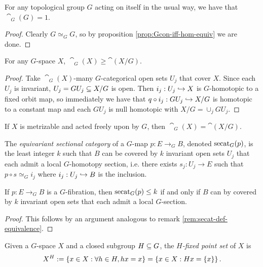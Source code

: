 \begin{corollary}
    For any topological group $G$ acting on itself in the usual way, we have that $\cat_G(G) = 1$.
    \begin{proof}
        Clearly $G \simeq_G G$, so by proposition \ref{prop:Gcon-iff-hom-equiv} we are done.
    \end{proof}
\end{corollary}

\begin{proposition}
    For any $G$-space $X$, $\cat_G(X) \geq \cat(X/G)$.
    \begin{proof}
        Take $\cat_G(X)$-many $G$-categorical open sets $U_j$ that cover $X$.
        Since each $U_j$ is invariant, $U_j = GU_j \subseteq X/G$ is open.
        Then $i_j : U_j \hookrightarrow X$ is $G$-homotopic to a fixed orbit map, so immediately we have that $q \circ i_j : GU_j \hookrightarrow X/G$ is homotopic to a constant map and each $GU_j$ is null homotopic with $X/G = \cup_j GU_j$.
    \end{proof}
\end{proposition}

\begin{proposition}
    If $X$ is metrizable and acted freely upon by $G$, then $\cat_G(X) = \cat(X/G)$.
\end{proposition}

\begin{definition}
    The \emph{equivariant sectional category} of a $G$-map $p : E \to_G B$, denoted $\operatorname{secat}_G(p)$, is the least integer $k$ such that $B$ can be covered by $k$ invariant open sets $U_j$ that each admit a local $G$-homotopy section, i.e. there exists $s_j : U_j \to E$ such that $p \circ s \simeq_G i_j$ where $i_j : U_j \hookrightarrow B$ is the inclusion.
\end{definition}

\begin{proposition}
    If $p : E \to_G B$ is a $G$-fibration, then $\operatorname{secat}_G(p) \leq k$ if and only if $B$ can by covered by $k$ invariant open sets that each admit a local $G$-section.
    \begin{proof}
        This follows by an argument analogous to remark \ref{rem:secat-def-equivalence}.
    \end{proof}
\end{proposition}

\begin{definition}
    Given a $G$-space $X$ and a closed subgroup $H \subseteq G$, the \emph{$H$-fixed point set} of $X$ is
    \[
        X^H
        := \left\{ x \in X : \forall h \in H, hx = x \right\}
        = \left\{ x \in X : Hx = \left\{ x \right\} \right\}.
    \]
\end{definition}

